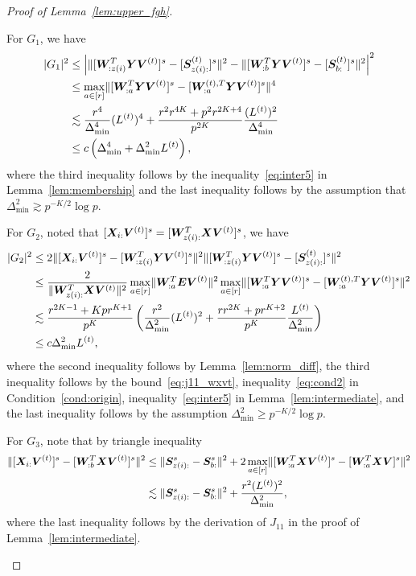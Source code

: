 \documentclass[lettersize,onecolumn,journal]{IEEEtran}
\theoremstyle{definition}
\theoremstyle{definition}
\newcommand{\of}[1]{\left(#1\right)}
\newcommand{\aabs}[1]{\left|#1\right|}
\begin{document}
\begin{proof}[Proof of Lemma~\ref{lem:upper_fgh}]
\begin{enumerate}
    For $G_1$, we have 
    \begin{align}
        |G_1|^2 &\leq \aabs{ \onormSize{}{ [ \mW_{:z(i)}^T \mY \mV^{(t)} ]^s - [ \mS_{z(i):}^{(t)}  ]^s}^2 - \onormSize{}{ [ \mW_{:b}^T \mY \mV^{(t)} ]^s -  [ \mS_{b:}^{(t)}  ]^s }^2 }^2 \\
        & \leq \max_{a \in [r]} \onormSize{}{ [ \mW_{:a}^T \mY \mV^{(t)} ]^s - [ \mW_{:a}^{(t),T} \mY \mV^{(t)}  ]^s}^4\\
        & \lesssim \frac{r^4}{\Delta_{\min}^4} (L^{(t)})^4 +  \frac{r^2 r^{4K} + p^2r^{2K+4}}{p^{2K}} \frac{(L^{(t)})^2}{\Delta_{\min}^4} \\
        & \leq c\of{\Delta_{\min}^4 +  \Delta_{\min}^2 L^{(t)}}, \label{eq:g1}
    \end{align}
    where the third inequality follows by the inequality~\eqref{eq:inter5} in Lemma~\ref{lem:membership} and the last inequality follows by the assumption that $\Delta_{\min}^2 \gtrsim p^{-K/2}\log p$.
    
    For $G_2$, noted that $[\bm X_{i:} \bm{V}^{(t)}]^s = [ \bm{W}_{z(i):}^T\bm X \bm{V}^{(t)}]^s$, we have 
    \begin{align}
        |G_2|^2 &\leq 2\onormSize{}{ [\mX_{i:} \mV^{(t)}]^s  -  [  \mW_{:z(i)}^T \mY \mV^{(t)} ]^s}^2 \onormSize{}{ [  \mW_{:z(i)}^T \mY \mV^{(t)} ]^s -  [  \mS_{z(i):}^{(t)}  ]^s }^2 \\
        & \leq \frac{2}{ \onormSize{}{ \mW_{z(i):}^T\mX \mV^{(t)}}^2} \max_{a \in [r]}\onormSize{}{ \mW_{:a}^T \mE \mV^{(t)} }^2 \max_{a \in [r]} \onormSize{}{ [  \mW_{:a}^T \mY \mV^{(t)} ]^s -  [   \mW_{:a}^{(t),T} \mY \mV^{(t)}  ]^s}^2\\
        & \lesssim \frac{ r^{2K-1} + K p r^{K+1} }{p^{K}} \of{ \frac{r^2}{\Delta_{\min}^2} (L^{(t)})^2 + \frac{r r^{2K} + pr^{K+2}}{p^{K}} \frac{L^{(t)}}{\Delta_{\min}^2} }\\
        & \leq c \Delta_{\min}^2 L^{(t)},\label{eq:g2}
    \end{align}
    where the second inequality follows by Lemma~\ref{lem:norm_diff}, the third inequality follows by the bound~\eqref{eq:j11_wxvt}, inequality~\eqref{eq:cond2} in Condition~\ref{cond:origin}, inequality~\eqref{eq:inter5} in Lemma~\ref{lem:intermediate},  and the last inequality follows by the assumption $\Delta_{\min}^2 \geq p^{-K/2} \log p$.
    
    For $G_3$, note that by triangle inequality
    \begin{align}
        \onormSize{}{[\mX_{i:} \mV^{(t)}]^s  -  [  \mW_{:b}^T \mX \mV^{(t)} ]^s}^2 &\leq \onormSize{}{\mS_{z(i):}^s - \mS_{b:}^s}^2 + 2\max_{a \in [r]}\onormSize{}{[\mW_{:a}^T\mX \mV^{(t)}]^s - [\mW_{:a}^T\mX \mV]^s }^2\\
        & \lesssim \onormSize{}{\mS_{z(i):}^s - \mS_{b:}^s}^2 + \frac{r^2 (L^{(t)})^2}{\Delta_{\min}^2}, \label{eq:g3xv_wxv}
    \end{align}
    where the last inequality follows by the derivation of $J_{11}$ in the proof of Lemma~\ref{lem:intermediate}.


\end{enumerate}
\end{proof}
\end{document}
